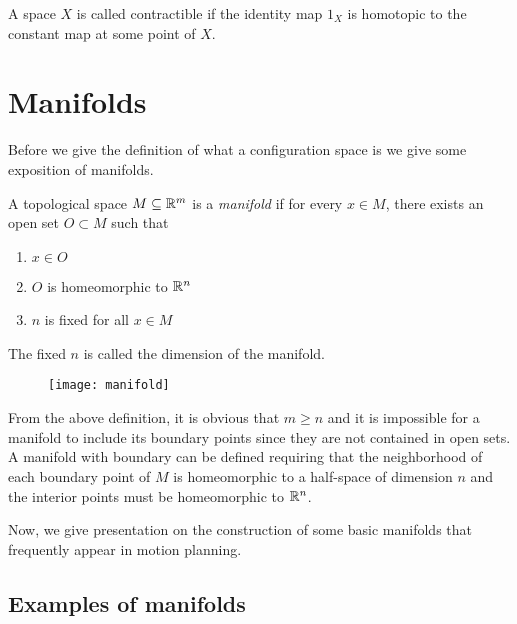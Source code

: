 
\begin{defn}
A space $X$ is called contractible if the identity map $1_X$ is homotopic to the constant map at some point of $X$.
\end{defn}

\section{Manifolds}
Before we give the definition of what a configuration space is we give some exposition of manifolds.
\begin{defn}
    A topological space $M \subseteq \mathbb{R}^m$ is a \textit{manifold} if for every $x \in M$, there exists an open set $O \subset M$ such that 
    \begin{enumerate}
        \item $x \in O$
        \item $O$ is homeomorphic to $\mathbb{R}^n$
        \item $n$ is fixed for all $x \in M$
    \end{enumerate}
    The fixed $n$ is called the dimension of the manifold.
    \begin{figure}[H]
        \centering
        \texttt{[image: manifold]}
    \end{figure}
\end{defn}

From the above definition, it is obvious that $m \ge n$ and it is impossible for a manifold to include its boundary points since they are not contained in open sets.
\linebreak
A manifold with boundary can be defined requiring that the neighborhood of each boundary point of $M$ is homeomorphic to a half-space of dimension $n$ and the interior points must be homeomorphic to $\mathbb{R}^n$.

Now, we give presentation on the construction of some basic manifolds that frequently appear in motion planning.

\subsection{Examples of manifolds}

